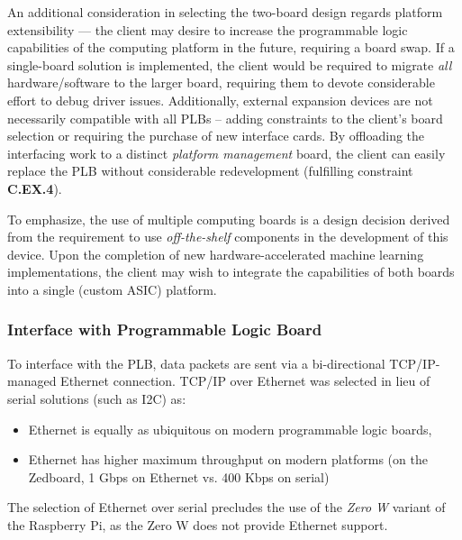 An additional consideration in selecting the two-board design regards platform extensibility --- the client may desire to increase the programmable logic capabilities of the computing platform in the future, requiring a board swap. If a single-board solution is implemented, the client would be required to migrate \textit{all} hardware/software to the larger board, requiring them to devote considerable effort to debug driver issues. Additionally, external expansion devices are not necessarily compatible with all PLBs -- adding constraints to the client's board selection or requiring the purchase of new interface cards. By offloading the interfacing work to a distinct \textit{platform management} board, the client can easily replace the PLB without considerable redevelopment (fulfilling constraint \textbf{C.EX.4}). 

To emphasize, the use of multiple computing boards is a design decision derived from the requirement to use \textit{off-the-shelf} components in the development of this device. Upon the completion of new hardware-accelerated machine learning implementations, the client may wish to integrate the capabilities of both boards into a single (custom ASIC) platform. 

\subsubsection{Interface with Programmable Logic Board}

To interface with the PLB, data packets are sent via a bi-directional TCP/IP-managed Ethernet connection. TCP/IP over Ethernet was selected in lieu of serial solutions (such as I2C) as:
\begin{itemize}
\item Ethernet is equally as ubiquitous on modern programmable logic boards,
\item Ethernet has higher maximum throughput on modern platforms (on the Zedboard, 1 Gbps on Ethernet vs. 400 Kbps on serial)
\end{itemize} 

The selection of Ethernet over serial precludes the use of the \textit{Zero W} variant of the Raspberry Pi, as the Zero W does not provide Ethernet support. 
